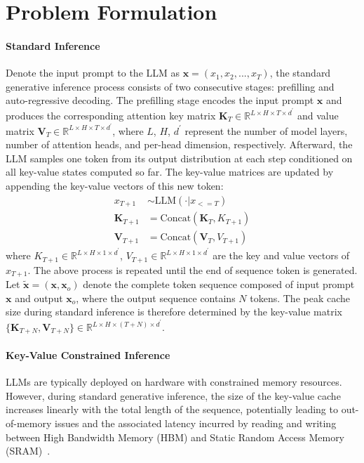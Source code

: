 \section{Problem Formulation}
\paragraph{Standard Inference} Denote the input prompt to the LLM as $\bm{x}=(x_1,x_2,...,x_{T})$, the standard generative inference process consists of two consecutive stages: prefilling and auto-regressive decoding. The prefilling stage encodes the input prompt $\bm{x}$ and produces the corresponding attention key matrix $\bm{K}_T\in \mathbb{R}^{L\times H\times T\times d^\prime}$ and value matrix $\bm{V}_T\in \mathbb{R}^{L\times H\times T\times d^\prime}$, 
where $L$, $H$, $d^\prime$ represent the number of model layers, number of attention heads, and per-head dimension, respectively. 
Afterward, the LLM samples one token from its output distribution at each step conditioned on all key-value states computed so far. The key-value matrices are updated by appending the key-value vectors of this new token:
\begin{align}
    x_{T+1}&\sim \text{LLM}(\cdot | x_{<=T}) \\
    \bm{K}_{T+1}&=\text{Concat}(\bm{K}_T, K_{T+1}) \\ 
    \bm{V}_{T+1}&=\text{Concat}(\bm{V}_T, V_{T+1})
\end{align}
where $K_{T+1}\in \mathbb{R}^{L\times H\times 1\times d^\prime}$, $V_{T+1}\in \mathbb{R}^{L\times H\times 1\times d^\prime}$ are the key and value vectors of $x_{T+1}$. 
The above process is repeated until the end of sequence token is generated. Let $\tilde{\bm{x}}=(\bm{x}, \bm{x}_o)$ denote the complete token sequence composed of input prompt $\bm{x}$ and output $\bm{x}_o$, where the output sequence contains $N$ tokens. 
The peak cache size during standard inference is therefore determined by the key-value matrix $\{\bm{K}_{T+N},\bm{V}_{T+N}\}\in \mathbb{R}^{L\times H\times (T+N)\times d^\prime}$.

\paragraph{Key-Value Constrained Inference}
LLMs are typically deployed on hardware with constrained memory resources. However, during standard generative inference, the size of the key-value cache increases linearly with the total length of the sequence, potentially leading to out-of-memory issues and the associated latency incurred by reading and writing between High Bandwidth Memory (HBM) and Static Random Access Memory (SRAM)~\cite{dao2022flashattention}.

